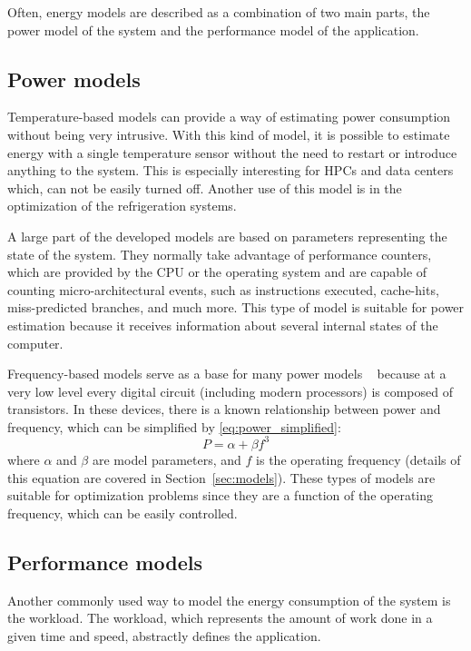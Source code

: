 \documentclass{ieeeaccess}
\begin{document}
Often, energy models are described as a combination of two main parts, the power model of the system and the performance model of the application. 

\subsection{Power models}
Temperature-based models\cite{ZhangEnergyInfrastructure} can provide a way of estimating power consumption without being very intrusive. With this kind of model, it is possible to estimate energy with a single temperature sensor without the need to restart or introduce anything to the system. This is especially interesting for HPCs and data centers which, can not be easily turned off. Another use of this model is in the optimization of the refrigeration systems.

A large part of the developed models are based on parameters representing the state of the system. They normally take advantage of performance counters, which are provided by the CPU or the operating system and are capable of counting micro-architectural events, such as instructions executed, cache-hits, miss-predicted branches, and much more. 
This type of model is suitable for power estimation because it receives information about several internal states of the computer.

Frequency-based models serve as a base for many power models ~\cite{Sarwar1997, Butzen2007, Usman2013ANoC} because at a very low level every digital circuit (including modern processors) is composed of transistors. In these devices, there is a known relationship between power and frequency, which can be simplified by \cref{eq:power_simplified}: 
\begin{equation}
    P = \alpha+\beta f^3
    \label{eq:power_simplified}
\end{equation}
where $\alpha$ and $\beta$ are model parameters, and $f$ is the operating frequency (details of this equation are covered in Section~\ref{sec:models}). These types of models are suitable for optimization problems since they are a function of the operating frequency, which can be easily controlled.

\subsection{Performance models}
Another commonly used way to model the energy consumption of the system is the workload. The workload, which represents the amount of work done in a given time and speed, abstractly defines the application.  
\end{document}
